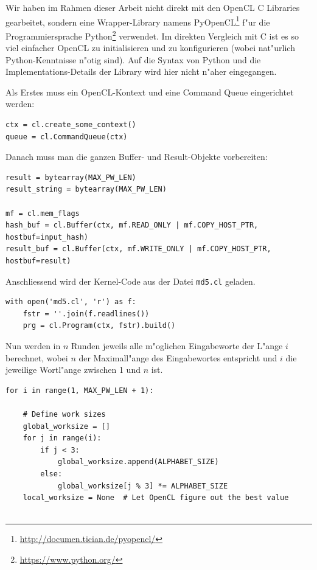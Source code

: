 \begin{refsection}
Wir haben im Rahmen dieser Arbeit nicht direkt mit den OpenCL C Libraries
gearbeitet, sondern eine Wrapper-Library namens
PyOpenCL\footnote{\url{http://documen.tician.de/pyopencl/}} f"ur die
Programmiersprache Python\footnote{\url{https://www.python.org/}} verwendet. Im
direkten Vergleich mit C ist es so viel einfacher OpenCL zu initialisieren und
zu konfigurieren (wobei nat"urlich Python-Kenntnisse n"otig sind). Auf die
Syntax von Python und die Implementations-Details der Library wird hier nicht
n"aher eingegangen.

Als Erstes muss ein OpenCL-Kontext und eine Command Queue eingerichtet werden:

\begin{small}
\begin{verbatim}
ctx = cl.create_some_context()
queue = cl.CommandQueue(ctx)
\end{verbatim}
\end{small}

\noindent Danach muss man die ganzen Buffer- und Result-Objekte vorbereiten:

\begin{small}
\begin{verbatim}
result = bytearray(MAX_PW_LEN)
result_string = bytearray(MAX_PW_LEN)

mf = cl.mem_flags
hash_buf = cl.Buffer(ctx, mf.READ_ONLY | mf.COPY_HOST_PTR, hostbuf=input_hash)
result_buf = cl.Buffer(ctx, mf.WRITE_ONLY | mf.COPY_HOST_PTR, hostbuf=result)
\end{verbatim}
\end{small}

\noindent Anschliessend wird der Kernel-Code aus der Datei \texttt{md5.cl}
geladen.

\begin{small}
\begin{verbatim}
with open('md5.cl', 'r') as f:
    fstr = ''.join(f.readlines())
    prg = cl.Program(ctx, fstr).build()
\end{verbatim}
\end{small}

\noindent Nun werden in $n$ Runden jeweils alle m"oglichen Eingabeworte der
L"ange $i$ berechnet, wobei $n$ der Maximall"ange des Eingabewortes entspricht
und $i$ die jeweilige Wortl"ange zwischen 1 und $n$ ist.

\begin{small}
\begin{verbatim}
for i in range(1, MAX_PW_LEN + 1):

    # Define work sizes
    global_worksize = []
    for j in range(i):
        if j < 3:
            global_worksize.append(ALPHABET_SIZE)
        else:
            global_worksize[j % 3] *= ALPHABET_SIZE
    local_worksize = None  # Let OpenCL figure out the best value


\end{verbatim}
\end{small}
\end{refsection}
